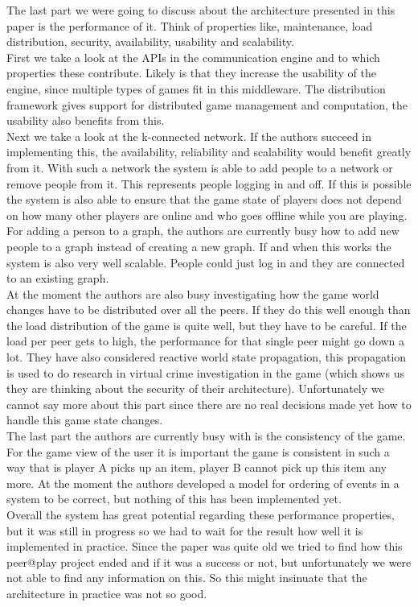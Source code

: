 The last part we were going to discuss about the architecture presented in this paper is the performance of it. 
Think of properties like, maintenance, load distribution, security, availability, usability and scalability. \\
First we take a look at the APIs in the communication engine and to which properties these contribute. 
Likely is that they increase the usability of the engine, since multiple types of games fit in this middleware. 
The distribution framework gives support for distributed game management and computation, the usability also benefits from this.\\
Next we take a look at the k-connected network. 
If the authors succeed in implementing this, the availability, reliability and scalability would benefit greatly from it. 
With such a network the system is able to add people to a network or remove people from it. 
This represents people logging in and off. 
If this is possible the system is also able to ensure that the game state of players does not depend on how many other players are online and who goes offline while you are playing. 
For adding a person to a graph, the authors are currently busy how to add new people to a graph instead of creating a new graph. 
If and when this works the system is also very well scalable. 
People could just log in and they are connected to an existing graph.\\

At the moment the authors are also busy investigating how the game world changes have to be distributed over all the peers. 
If they do this well enough than the load distribution of the game is quite well, but they have to be careful. 
If the load per peer gets to high, the performance for that single peer might go down a lot. 
They have also considered reactive world state propagation, this propagation is used to do research in virtual crime investigation in the game (which shows us they are thinking about the security of their architecture).
Unfortunately we cannot say more about this part since there are no real decisions made yet how to handle this game state changes.\\
The last part the authors are currently busy with is the consistency of the game. 
For the game view of the user it is important the game is consistent in such a way that is player A picks up an item, player B cannot pick up this item any more. 
At the moment the authors developed a model for ordering of events in a system to be correct, but nothing of this has been implemented yet. \\

Overall the system has great potential regarding these performance properties, but it was still in progress so we had to wait for the result how well it is implemented in practice. 
Since the paper was quite old we tried to find how this peer@play project ended and if it was a success or not, but unfortunately we were not able to find any information on this. 
So this might insinuate that the architecture in practice was not so good.